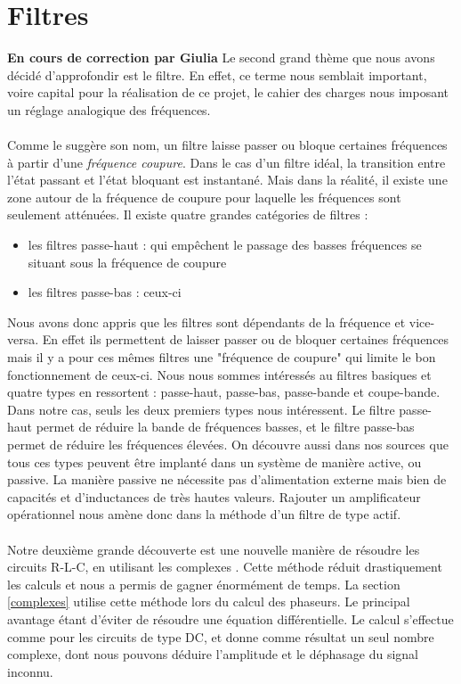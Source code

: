 \section{Filtres}
\Large{\textbf{En cours de correction par Giulia}}
Le second grand thème que nous avons décidé d'approfondir est le filtre. En effet, ce terme nous semblait 
important, voire capital pour la réalisation de ce projet, le cahier des charges nous imposant un réglage 
analogique des fréquences.

\paragraph{}
Comme le suggère son nom, un filtre laisse passer ou bloque certaines fréquences à partir d'une \emph{fréquence coupure}. Dans le cas d'un filtre idéal, la transition entre l'état passant et l'état bloquant est instantané. Mais dans la réalité, il existe une zone autour de la fréquence de coupure pour laquelle les fréquences sont seulement atténuées. Il existe quatre grandes catégories de filtres : 
\begin{itemize}
\item les filtres passe-haut : qui empêchent le passage des basses fréquences se situant sous la fréquence de coupure
\item les filtres passe-bas : ceux-ci 
\end{itemize}

Nous avons donc appris que les filtres sont dépendants de la fréquence et vice-versa. En effet ils permettent de 
laisser passer ou de bloquer certaines fréquences mais il y a pour ces mêmes filtres une "fréquence de coupure" 
qui limite le bon fonctionnement de ceux-ci. Nous nous sommes intéressés au filtres basiques et quatre types en 
ressortent : passe-haut, passe-bas, passe-bande et coupe-bande. Dans notre cas, seuls les deux premiers types nous 
intéressent. Le filtre passe-haut permet de réduire la bande de fréquences basses, et le filtre passe-bas permet de 
réduire les fréquences élevées. On découvre aussi dans nos sources que tous ces types peuvent être implanté dans un 
système de manière active, ou passive. La manière passive ne nécessite pas d'alimentation externe mais bien de 
capacités et d'inductances de très hautes valeurs. Rajouter un amplificateur opérationnel nous amène donc 
dans la méthode d'un filtre de type 
actif. \cite{Kularatna}

\paragraph{}
Notre deuxième grande découverte est une nouvelle manière de résoudre les circuits R-L-C, en utilisant les 
complexes \cite{Irwin}. Cette méthode réduit drastiquement les calculs et nous a permis de gagner 
énormément de temps. La section \ref{complexes} utilise cette méthode lors du calcul des phaseurs. Le principal 
avantage étant d'éviter de résoudre une équation différentielle. Le calcul s'effectue comme pour les circuits de 
type DC, et donne comme résultat un seul nombre complexe, dont nous pouvons déduire l'amplitude et le déphasage du 
signal inconnu.